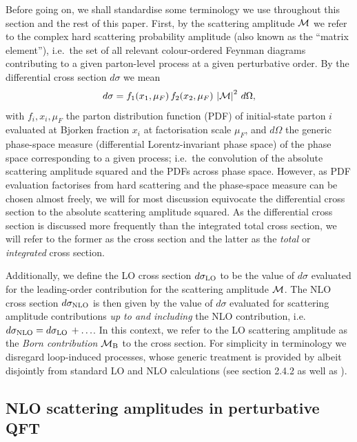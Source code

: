 \documentclass[a4paper,11pt]{article}
\begin{document}
Before going on, we shall standardise some terminology we use throughout this section and the rest of this paper. First, by the scattering amplitude $\mathcal{M}{}$ we refer to the complex hard scattering probability amplitude (also known as the ``matrix element''), i.e.\ the set of all relevant colour-ordered Feynman diagrams contributing to a given parton-level process at a given perturbative order. By the differential cross section $d\sigma$ we mean
\begin{align}
    d\sigma = f_1(x_1,\mu_F) \, f_2(x_2,\mu_F) \, \left| \mathcal{M}\right|^2{} \, d\Omega,
\end{align}
with $f_i,x_i,\mu_F$ the parton distribution function (PDF) of initial-state parton $i$ evaluated at Bjorken fraction $x_i$ at factorisation scale $\mu_F$, and $d\Omega$ the generic phase-space measure (differential Lorentz-invariant phase space) of the phase space corresponding to a given process; i.e.\ the convolution of the absolute scattering amplitude squared and the PDFs across phase space. However, as PDF evaluation factorises from hard scattering and the phase-space measure can be chosen almost freely, we will for most discussion equivocate the differential cross section to the absolute scattering amplitude squared. As the differential cross section is discussed more frequently than the integrated total cross section, we will refer to the former as the cross section and the latter as the \textit{total} or \textit{integrated} cross section.

Additionally, we define the LO  cross section $d\sigma_{\mathrm{LO}}{}$ to be the value of $d\sigma$ evaluated for the leading-order contribution for the scattering amplitude $\mathcal{M}{}$. The NLO cross section $d\sigma_{\mathrm{NLO}}$ is then given by the value of $d\sigma$ evaluated for scattering amplitude contributions \textit{up to and including} the NLO contribution, i.e.\ $d\sigma_{\mathrm{NLO}}{} = d\sigma_{\mathrm{LO}}{} \, + \ldots $. In this context, we refer to the LO scattering amplitude as the \textit{Born contribution} $\mathcal{M}_{\mathrm{B}}{}$ to the cross section. For simplicity in terminology we disregard loop-induced processes, whose generic treatment is provided by \mg{} albeit disjointly from standard LO and NLO calculations (see section 2.4.2  \cite{Alwall:2014hca} as well as \cite{Hirschi:2015iia}).


\subsection{NLO scattering amplitudes in perturbative QFT}
\label{sec:sigmad_theory}
\end{document}

